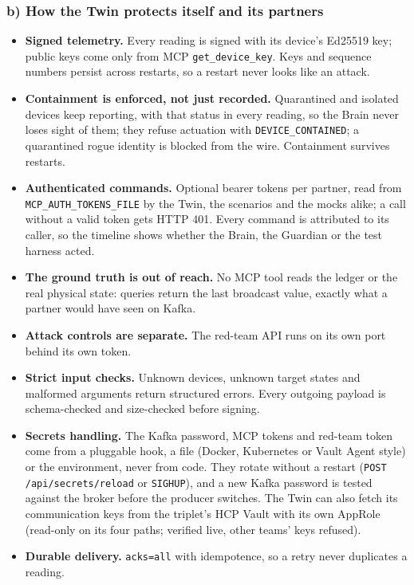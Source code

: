 \documentclass[10pt,a4paper]{article}
\begin{document}
\subsubsection{b) How the Twin protects itself and its partners}
\begin{itemize}[leftmargin=*,itemsep=0pt,topsep=1pt]
  \item \textbf{Signed telemetry.} Every reading is signed with its device's Ed25519 key; public keys come only from MCP \texttt{get\_device\_key}. Keys and sequence numbers persist across restarts, so a restart never looks like an attack.
  \item \textbf{Containment is enforced, not just recorded.} Quarantined and isolated devices keep reporting, with that status in every reading, so the Brain never loses sight of them; they refuse actuation with \texttt{DEVICE\_CONTAINED}; a quarantined rogue identity is blocked from the wire. Containment survives restarts.
  \item \textbf{Authenticated commands.} Optional bearer tokens per partner, read from \texttt{MCP\_AUTH\_TOKENS\_FILE} by the Twin, the scenarios and the mocks alike; a call without a valid token gets HTTP 401. Every command is attributed to its caller, so the timeline shows whether the Brain, the Guardian or the test harness acted.
  \item \textbf{The ground truth is out of reach.} No MCP tool reads the ledger or the real physical state: queries return the last broadcast value, exactly what a partner would have seen on Kafka.
  \item \textbf{Attack controls are separate.} The red-team API runs on its own port behind its own token.
  \item \textbf{Strict input checks.} Unknown devices, unknown target states and malformed arguments return structured errors. Every outgoing payload is schema-checked and size-checked before signing.
  \item \textbf{Secrets handling.} The Kafka password, MCP tokens and red-team token come from a pluggable hook, a file (Docker, Kubernetes or Vault Agent style) or the environment, never from code. They rotate without a restart (\texttt{POST /api/secrets/reload} or \texttt{SIGHUP}), and a new Kafka password is tested against the broker before the producer switches. The Twin can also fetch its communication keys from the triplet's HCP Vault with its own AppRole (read-only on its four paths; verified live, other teams' keys refused).
  \item \textbf{Durable delivery.} \texttt{acks=all} with idempotence, so a retry never duplicates a reading.
\end{itemize}
\end{document}
